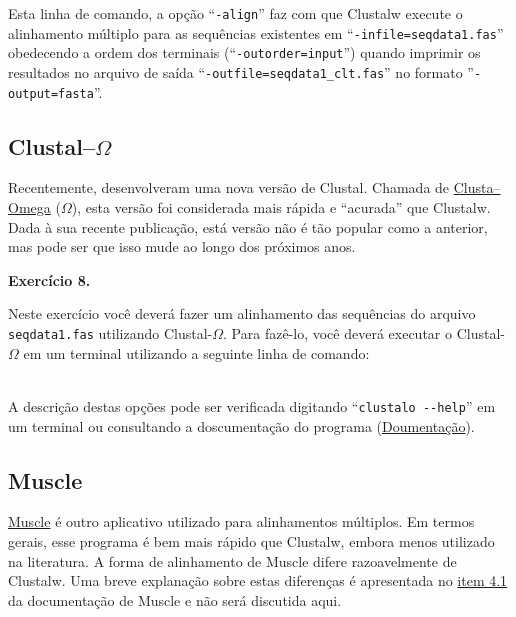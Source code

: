 \begin{refsection}
Esta linha de comando, a opção ``\texttt{-align}'' faz com que Clustalw execute o alinhamento múltiplo para as sequências existentes em ``\texttt{-infile=seqdata1.fas}'' obedecendo a ordem dos terminais (``\texttt{-outorder=input}'') quando imprimir os resultados no arquivo de saída ``\texttt{-outfile=seqdata1\_clt.fas}'' no formato ''\texttt{-output=fasta}''. 



\subsection{Clustal--$\Omega$}\label{tut8:msa:clustalo}

Recentemente, \textcite{Sievers_et_al_2011} desenvolveram uma nova versão de Clustal. Chamada de \href{http://www.clustal.org/omega/}{Clusta--Omega} ($\Omega$), esta versão foi considerada mais rápida e ``acurada'' que Clustalw. Dada à sua recente publicação, está versão não é tão popular como a anterior, mas pode ser que isso mude ao longo dos próximos anos.


\begin{blackBlock}{\textbf{Exercício 8.}}\label{tut8:ex:8.3}

Neste exercício você deverá fazer um alinhamento das sequências do arquivo \texttt{seqdata1.fas} utilizando Clustal-$\Omega$. Para fazê-lo, você deverá executar o Clustal-$\Omega$ em um terminal utilizando a seguinte linha de comando:\\

\scriptsize
{}\\
\normalsize

\end{blackBlock}

A descrição destas opções pode ser verificada digitando ``\texttt{clustalo {-}{-}help}'' em um terminal ou consultando a doscumentação do programa (\href{http://www.clustal.org/omega/README}{Doumentação}).


\subsection{Muscle}\label{tut8:msa:muscle}

\href{http://www.drive5.com/muscle/}{Muscle} \parencite{Edgar_2004} é outro aplicativo utilizado para alinhamentos múltiplos. Em termos gerais, esse programa é bem mais rápido que Clustalw, embora menos utilizado na literatura. A forma de alinhamento de Muscle difere razoavelmente de Clustalw. Uma breve explanação sobre estas diferenças é apresentada no \href{http://www.drive5.com/muscle/muscle.html#_Toc81224846}{item 4.1} da documentação de Muscle e não será discutida aqui.\\


\end{refsection}
